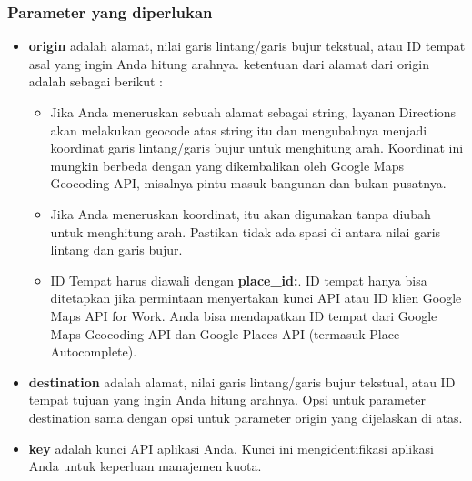 \subsubsection{Parameter yang diperlukan}
\label{subsubsec:parameterwajib}
\begin{itemize}
	\item \textbf{origin} adalah alamat, nilai garis lintang/garis bujur tekstual, atau ID tempat asal yang ingin Anda hitung arahnya. ketentuan dari alamat dari origin adalah sebagai berikut :
	\begin{itemize}
		\item Jika Anda meneruskan sebuah alamat sebagai string, layanan Directions akan melakukan geocode atas string itu dan mengubahnya menjadi koordinat garis lintang/garis bujur untuk menghitung arah. Koordinat ini mungkin berbeda dengan yang dikembalikan oleh Google Maps Geocoding API, misalnya pintu masuk bangunan dan bukan pusatnya.
		\item Jika Anda meneruskan koordinat, itu akan digunakan tanpa diubah untuk menghitung arah. Pastikan tidak ada spasi di antara nilai garis lintang dan garis bujur.
		\item ID Tempat harus diawali dengan \textbf{place\_id:}. ID tempat hanya bisa ditetapkan jika permintaan menyertakan kunci API atau ID klien Google Maps API for Work. Anda bisa mendapatkan ID tempat dari Google Maps Geocoding API dan Google Places API (termasuk Place Autocomplete).
	\end{itemize} 
	\item \textbf{destination} adalah alamat, nilai garis lintang/garis bujur tekstual, atau ID tempat tujuan yang ingin Anda hitung arahnya. Opsi untuk parameter destination sama dengan opsi untuk parameter origin yang dijelaskan di atas.
	\item \textbf{key} adalah kunci API aplikasi Anda. Kunci ini mengidentifikasi aplikasi Anda untuk keperluan manajemen kuota. 
\end{itemize} 

